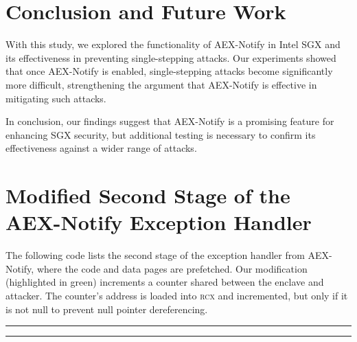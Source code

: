 \documentclass{llncs}
\begin{document}
\section{Conclusion and Future Work}

With this study, we explored the functionality of AEX-Notify in Intel SGX and
its effectiveness in preventing single-stepping attacks.
Our experiments showed that once AEX-Notify is enabled, single-stepping attacks become significantly more difficult, strengthening the argument that AEX-Notify is effective in mitigating such attacks.

In conclusion, our findings suggest that AEX-Notify is a promising feature for enhancing SGX security,
but additional testing is necessary to confirm its effectiveness against a wider range of attacks.


%


\backmatter
\appendix

\section{Modified Second Stage of the AEX-Notify Exception Handler}

The following code lists the second stage of the exception handler from AEX-Notify,
where the code and data pages are prefetched.
Our modification (highlighted in green) increments a counter shared between the enclave and attacker.
The counter's address is loaded into \textsc{rcx} and incremented, but only if it is not null to prevent null pointer dereferencing.

\noindent
\rule{0.8\textwidth}{0.4pt}
\vspace{-0.5em}
%
\vspace{-1.1em}
%
\vspace{-1.1em}

\vspace{-1em}
\rule{0.8\textwidth}{0.4pt}
\end{document}
